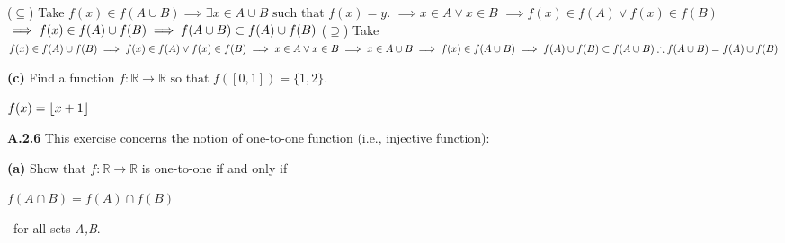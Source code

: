 \documentclass[12pt]{article}
\DeclarePairedDelimiter{\floor}{\lfloor}{\rfloor}
\newcommand{\R}{\mathbb{R}}
\begin{document}
\begin{solution}\newline
($\subseteq$) Take $f(x)\in f(A\cup B)\implies\exists x\in A\cup B \text{ such that } f(x)=y$.\newline
$\implies x\in A \lor x \in B$\newline
$\implies f(x)\in f(A)\lor f(x) \in f(B)$\newline
$\implies f(x)\in f(A)\cup f(B)\newline
\implies f(A\cup B)\subset f(A)\cup f(B)$\newline
($\supseteq$) Take $f(x)\in f(A)\cup f(B)\newline
\implies f(x)\in f(A) \lor f(x) \in f(B)\newline
\implies x\in A\lor x\in B\newline
\implies x\in A\cup B\newline
\implies f(x)\in f(A\cup B)\newline
\implies f(A)\cup f(B)\subset f(A\cup B)\newline
\therefore f(A\cup B)=f(A)\cup f(B)$
\end{solution}
\begin{subproblem}\textbf{(c)}
Find a function $f:\R\to\R\text{ so that } f([0,1])=\{1,2\}$.
\end{subproblem}

\begin{solution}\newline
$f(x)=\floor{x+1}$
\end{solution}
\begin{problem}\textbf{A.2.6}
This exercise concerns the notion of one-to-one function (i.e., injective function):
\end{problem}
\begin{subproblem}\textbf{(a)}
Show that $f:\R\to\R$ is one-to-one if and only if
\begin{center}
    $f(A\cap B) = f(A)\cap f(B)$
\end{center}
\tab \ for all sets \textit{A,B}.
\end{subproblem}
\end{document}
